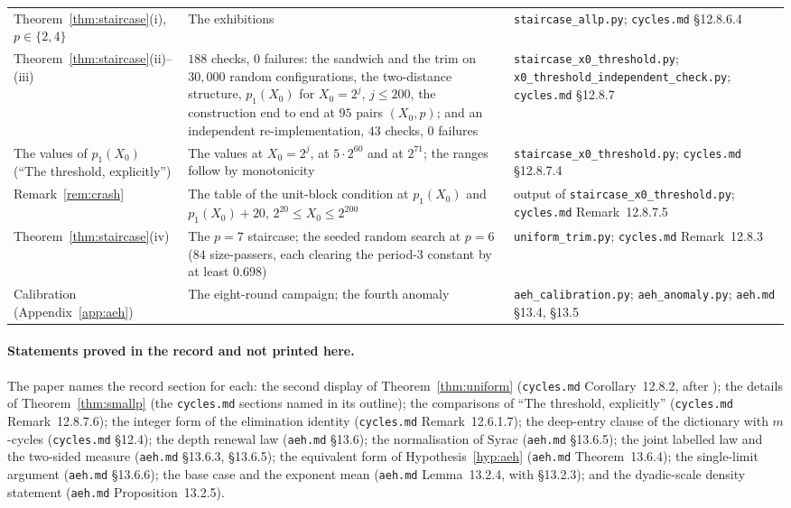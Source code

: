 \documentclass[11pt]{article}
\theoremstyle{remark}
\begin{document}
{\begin{longtable}{>{\raggedright\arraybackslash}p{}>{\raggedright\arraybackslash}p{}>{\raggedright\arraybackslash}p{}}
Theorem~\ref{thm:staircase}(i), $p \in \{2,4\}$ & The exhibitions & \texttt{staircase\_allp.py}; \texttt{cycles.md} \S12.8.6.4 \\
Theorem~\ref{thm:staircase}(ii)--(iii) & $188$ checks, $0$ failures: the sandwich and the trim on $30{,}000$ random configurations, the two-distance structure, $p_1(X_0)$ for $X_0 = 2^j$, $j \le 200$, the construction end to end at $95$ pairs $(X_0,p)$; and an independent re-implementation, $43$ checks, $0$ failures & \texttt{staircase\_x0\_threshold.py}; \texttt{x0\_threshold\_\allowbreak independent\_check.py}; \texttt{cycles.md} \S12.8.7 \\
The values of $p_1(X_0)$ (``The threshold, explicitly'') & The values at $X_0 = 2^j$, at $5\cdot 2^{60}$ and at $2^{71}$; the ranges follow by monotonicity & \texttt{staircase\_x0\_threshold.py}; \texttt{cycles.md} \S12.8.7.4 \\
Remark~\ref{rem:crash} & The table of the unit-block condition at $p_1(X_0)$ and $p_1(X_0) + 20$, $2^{20} \le X_0 \le 2^{200}$ & output of \texttt{staircase\_x0\_threshold.py}; \texttt{cycles.md} Remark~12.8.7.5 \\
Theorem~\ref{thm:staircase}(iv) & The $p = 7$ staircase; the seeded random search at $p = 6$ ($84$ size-passers, each clearing the period-$3$ constant by at least $0.698$) & \texttt{uniform\_trim.py}; \texttt{cycles.md} Remark~12.8.3 \\
Calibration (Appendix~\ref{app:aeh}) & The eight-round campaign; the fourth anomaly & \texttt{aeh\_calibration.py}; \texttt{aeh\_anomaly.py}; \texttt{aeh.md} \S13.4, \S13.5 \\
\hline
\end{longtable}
}

\paragraph{Statements proved in the record and not printed here.} The paper names the record section for each: the second display of Theorem~\ref{thm:uniform} (\texttt{cycles.md} Corollary~12.8.2, after \cite[Lemma~14, Theorem~3(d)]{sdw}); the details of Theorem~\ref{thm:smallp} (the \texttt{cycles.md} sections named in its outline); the comparisons of ``The threshold, explicitly'' (\texttt{cycles.md} Remark~12.8.7.6); the integer form of the elimination identity (\texttt{cycles.md} Remark~12.6.1.7); the deep-entry clause of the dictionary with $m$-cycles (\texttt{cycles.md} \S12.4); the depth renewal law (\texttt{aeh.md} \S13.6); the normalisation of $\mathrm{Syrac}$ (\texttt{aeh.md} \S13.6.5); the joint labelled law and the two-sided measure (\texttt{aeh.md} \S13.6.3, \S13.6.5); the equivalent form of Hypothesis~\ref{hyp:aeh} (\texttt{aeh.md} Theorem~13.6.4); the single-limit argument (\texttt{aeh.md} \S13.6.6); the base case and the exponent mean (\texttt{aeh.md} Lemma~13.2.4, with \S13.2.3); and the dyadic-scale density statement (\texttt{aeh.md} Proposition~13.2.5).
\end{document}
